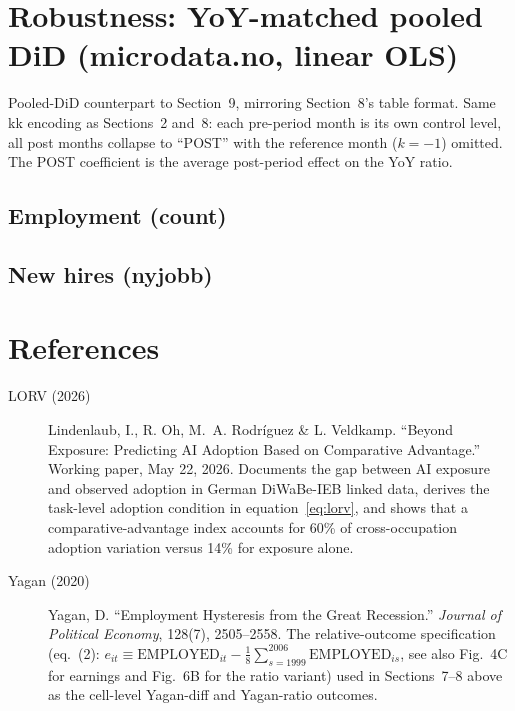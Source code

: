 \documentclass[11pt]{article}
\begin{document}
\clearpage
\section{Robustness: YoY-matched pooled DiD (microdata.no, linear OLS)}

\noindent
Pooled-DiD counterpart to Section~9, mirroring Section~8's table format.
Same kk encoding as Sections~2 and~8: each pre-period month is its own
control level, all post months collapse to ``POST'' with the reference
month ($k=-1$) omitted. The POST coefficient is the average post-period
effect on the YoY ratio.

\subsection{Employment (count)}


\clearpage
\subsection{New hires (nyjobb)}


\clearpage
\section*{References}

\begin{description}
  \item[LORV (2026)] Lindenlaub, I., R. Oh, M.~A. Rodríguez \& L. Veldkamp.
  ``Beyond Exposure: Predicting AI Adoption Based on Comparative
  Advantage.'' Working paper, May 22, 2026. Documents the gap between AI
  exposure and observed adoption in German DiWaBe-IEB linked data, derives
  the task-level adoption condition in equation~\eqref{eq:lorv}, and shows
  that a comparative-advantage index accounts for 60\% of cross-occupation
  adoption variation versus 14\% for exposure alone.
  \item[Yagan (2020)] Yagan, D. ``Employment Hysteresis from the Great
  Recession.'' \emph{Journal of Political Economy}, 128(7), 2505--2558.
  The relative-outcome specification (eq.~(2): $e_{it} \equiv
  \mathrm{EMPLOYED}_{it} - \tfrac{1}{8}\sum_{s=1999}^{2006}
  \mathrm{EMPLOYED}_{is}$, see also Fig.~4C for earnings and Fig.~6B for
  the ratio variant) used in Sections~7--8 above as the cell-level
  Yagan-diff and Yagan-ratio outcomes.
\end{description}
\end{document}
